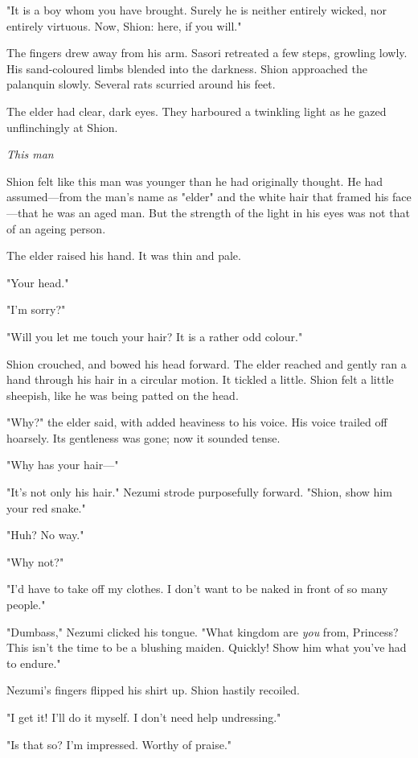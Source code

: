 "It is a boy whom you have brought. Surely he is neither entirely
wicked, nor entirely virtuous. Now, Shion: here, if you will."

The fingers drew away from his arm. Sasori retreated a few steps,
growling lowly. His sand-coloured limbs blended into the darkness. Shion
approached the palanquin slowly. Several rats scurried around his feet.

The elder had clear, dark eyes. They harboured a twinkling light as he
gazed unflinchingly at Shion.

\emph{This man\el }

Shion felt like this man was younger than he had originally thought. He
had assumed---from the man's name as "elder" and the white hair that
framed his face---that he was an aged man. But the strength of the light
in his eyes was not that of an ageing person.

The elder raised his hand. It was thin and pale.

"Your head."

"I'm sorry?"

"Will you let me touch your hair? It is a rather odd colour."

Shion crouched, and bowed his head forward. The elder reached and gently
ran a hand through his hair in a circular motion. It tickled a little.
Shion felt a little sheepish, like he was being patted on the head.

"Why?" the elder said, with added heaviness to his voice. His voice
trailed off hoarsely. Its gentleness was gone; now it sounded tense.

"Why has your hair---"

"It's not only his hair." Nezumi strode purposefully forward. "Shion,
show him your red snake."

"Huh? No way."

"Why not?"

"I'd have to take off my clothes. I don't want to be naked in front of
so many people."

"Dumbass," Nezumi clicked his tongue. "What kingdom are \emph{you} from,
Princess? This isn't the time to be a blushing maiden. Quickly! Show him
what you've had to endure."

Nezumi's fingers flipped his shirt up. Shion hastily recoiled.

"I get it! I'll do it myself. I don't need help undressing."

"Is that so? I'm impressed. Worthy of praise."

